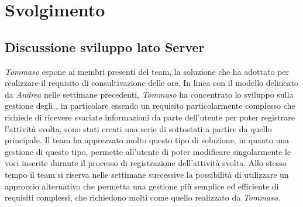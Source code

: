 \section{Svolgimento}
\subsection{Discussione sviluppo lato Server}
\textit{Tommaso} espone ai membri presenti del team, la soluzione che ha adottato per realizzare il requisito di consultivazione delle ore. In linea con il modello delineato da \textit{Andrea} nelle settimane precedenti, \textit{Tommaso} ha concentrato lo sviluppo sulla gestione degli , in particolare essendo un requisito particolarmente complesso che richiede di ricevere svariate informazioni da parte dell'utente per poter registrare l'attività svolta, sono stati creati una serie di sottostati a partire da quello principale. \newline
Il team ha apprezzato molto questo tipo di soluzione, in quanto una gestione di questo tipo, permette all'utente di poter modificare singolarmente le voci inserite durante il processo di registrazione dell'attività svolta. Allo stesso tempo il team si riserva nelle settimane successive la possibilità di utilizzare un approccio alternativo che permetta una gestione più semplice ed efficiente di requisiti complessi, che richiedono molti  come quello realizzato da \textit{Tommaso}.

